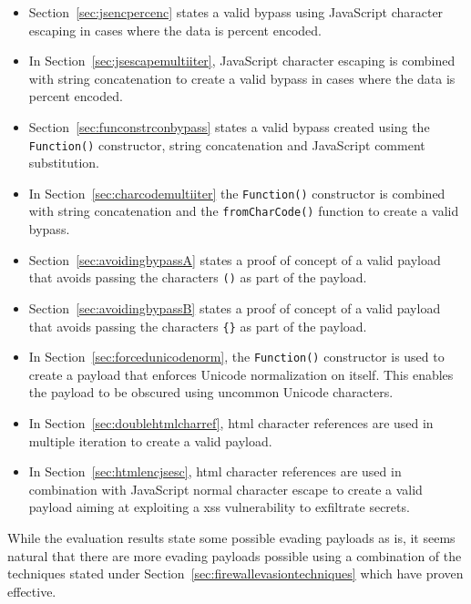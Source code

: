 \begin{itemize}
	\item Section~\ref{sec:jsencpercenc} states a valid bypass using JavaScript character escaping in cases where the data is percent encoded.

	\item In Section~\ref{sec:jsescapemultiiter}, JavaScript character escaping is combined with string concatenation to create a valid bypass in cases where the data is percent encoded.

	\item Section~\ref{sec:funconstrconbypass} states a valid bypass created using the \verb|Function()| constructor, string concatenation and JavaScript comment substitution.

	\item In Section~\ref{sec:charcodemultiiter} the \verb|Function()| constructor is combined with string concatenation and the \verb|fromCharCode()| function to create a valid bypass.

	\item Section~\ref{sec:avoidingbypassA} states a proof of concept of a valid payload that avoids passing the characters \verb|()| as part of the payload.

	\item Section~\ref{sec:avoidingbypassB} states a proof of concept of a valid payload that avoids passing the characters \verb|{}| as part of the payload.

	\item In Section~\ref{sec:forcedunicodenorm}, the \verb|Function()| constructor is used to create a payload that enforces Unicode normalization on itself. This enables the payload to be obscured using uncommon Unicode characters.

	\item In Section~\ref{sec:doublehtmlcharref}, \acrshort{html} character references are used in multiple iteration to create a valid payload.

	\item In Section~\ref{sec:htmlencjsesc}, \acrshort{html} character references are used in combination with JavaScript normal character escape to create a valid payload aiming at exploiting a \acrshort{xss} vulnerability to exfiltrate secrets.
\end{itemize}

While the evaluation results state some possible evading payloads as is, it seems natural that there are more evading payloads possible using a combination of the techniques stated under Section~\ref{sec:firewallevasiontechniques} which have proven effective.

